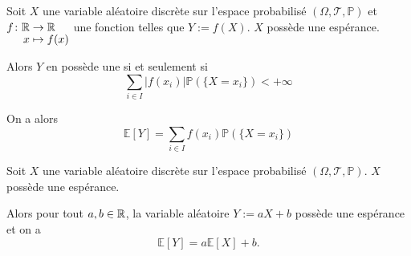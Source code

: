 \documentclass[a4paper,12pt]{article}
\begin{document}
\begin{demonstration}









    
\end{demonstration}

\begin{definition}
    Soit $X$ une variable aléatoire discrète sur l'espace probabilisé $(\Omega, \mathcal{T}, \mathbb{P})$ et $\funcdef{f}{\R}{\R}{x}{f(x)}$ une fonction telles que $Y:= f(X)$.
    $X$ possède une espérance.
    
    Alors $Y$ en possède une si et seulement si
    $$
    \sum_{i \in I} |f(x_i)| \mathbb{P}(\{ X = x_i \}) < +\infty
    $$
    
    On a alors
    $$
    \mathbb{E}[Y] = \sum_{i \in I} f(x_i) \mathbb{P}(\{ X = x_i \})
    $$
\end{definition}

\begin{corollaire}{}{}
    Soit $X$ une variable aléatoire discrète sur l'espace probabilisé $(\Omega, \mathcal{T}, \mathbb{P})$.
    $X$ possède une espérance.

    Alors pour tout $a, b \in \mathbb{R}$, la variable aléatoire $Y:= aX + b$ possède une espérance et on a
    $$
    \mathbb{E}[Y] = a \mathbb{E}[X] + b.
    $$
\end{corollaire}
\end{document}
